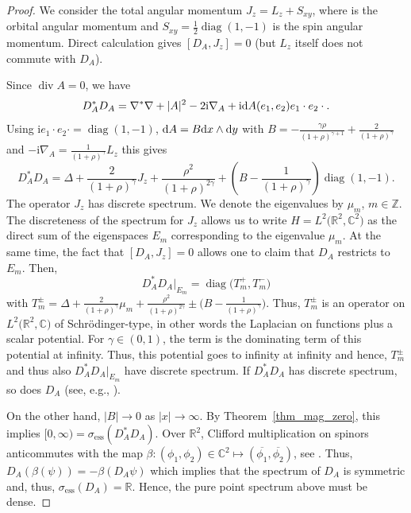 \documentclass[pdftex]{sigma}
\numberwithin{equation}{section}
\begin{document}
\begin{proof}We consider the total angular momentum $J_z=L_z+S_{xy}$, where 
is the orbital angular momentum and $S_{xy}=\frac{\mathrm{1}}{2}\operatorname{diag}(1, -1)$ is the spin angular momentum. Direct calculation gives $[D_A, J_z]=0$ (but $L_z$ itself does not commute with $D_A$).
	
Since $\operatorname{div} A=0$, we have
\[ D_A^*D_A= \nabla^*\nabla + |A|^2 - 2{\mathrm{i}}  \nabla_A + {\mathrm{i}}  {\rm d}A(e_1,e_2)e_1\cdot e_2\cdot . \]	
Using ${\mathrm{i}}  e_1\cdot e_2 \cdot = \operatorname{diag}(1,-1)$, ${\rm d}A=B {\rm d}x\wedge {\rm d}y$ with $B= -\frac{\gamma \rho}{(1+\rho)^{\gamma +1}} + \frac{2}{(1+\rho)^{\gamma}}$ and $-{\mathrm{i}}\nabla_A =\frac{1}{(1+\rho)^{\gamma}}L_z$ this gives	
\[ D_A^*D_A = \Delta + \frac{2}{(1+\rho)^{\gamma}}J_z + \frac{\rho^2}{(1+\rho)^{2\gamma}} + \left(B -\frac{1}{(1+\rho)^{\gamma}}\right)\operatorname{diag}(1,-1).\]
The operator $J_z$ has discrete spectrum. We denote the eigenvalues by $\mu_m$, $m\in \mathbb Z$. The discreteness of the spectrum for $J_z$ allows us to write $H=L^2\bigl({\mathbb R}^2, {\mathbb C}^2\bigr)$ as the direct sum of the eigenspaces $E_m$ corresponding to the eigenvalue $\mu_m$. At the same time, the fact that $[D_A, J_z]=0$ allows one to claim that $D_A$ restricts to $E_m$. Then,
\[ D_A^*D_A|_{E_m}= \operatorname{diag}\bigl(T^+_m, T^-_m\bigr) \]
with $T^\pm_m= \Delta + \frac{2}{(1+\rho)^{\gamma}}\mu_m + \frac{\rho^2}{(1+\rho)^{2\gamma}} \pm \bigl(B -\frac{1}{(1+\rho)^{\gamma}}\bigr)$.
Thus, $T_m^\pm$ is an operator on $L^2\bigl({\mathbb R}^2, {\mathbb C}\bigr)$ of Schr\"odinger-type, in other words the Laplacian on functions plus a scalar potential. For $\gamma\in (0,1)$, the term  is the dominating term of this potential at infinity. Thus, this potential goes to infinity at infinity and hence, $T_m^\pm$ and thus also $ D_A^*D_A|_{E_m}$ have discrete spectrum. If $D_A^*D_A$ has discrete spectrum, so does $D_A$ (see, e.g., \cite[Lemma~B.8]{AG}).
	
On the other hand, $|B|\to 0$ as $|x|\to \infty$. By Theorem~\ref{thm_mag_zero}, this implies $[0,\infty)=\sigma_{\mathrm{ess}} (D_A^*D_A)$. Over ${\mathbb R}^2$, Clifford multiplication on spinors anticommutes with the map $\beta\colon (\phi_1, \phi_2)\in {\mathbb C}^2\mapsto (\overline{\phi_1}, \overline{\phi_2})$, see \cite[Section~1.7]{Fr}. Thus, $D_A(\beta(\psi))=-\beta(D_A\psi)$ which implies that the spectrum of $D_A$ is symmetric and, thus, $\sigma_{\mathrm{ess}} (D_A)={\mathbb R}$. Hence, the pure point spectrum above must be dense.
\end{proof}	
\end{document}
